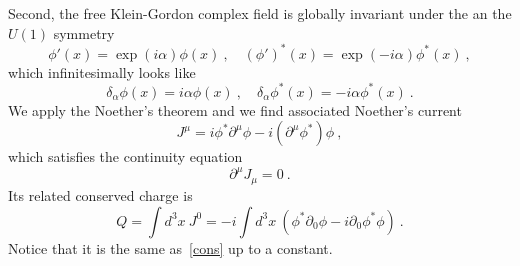     Second, the free Klein-Gordon complex field is globally invariant under the an the $U(1)$ symmetry
    \begin{equation*}
        \phi'(x) = \exp(i \alpha) \phi(x) ~, \quad (\phi')^*(x) = \exp(- i \alpha) \phi^*(x) ~,
    \end{equation*}
    which infinitesimally looks like
    \begin{equation*}
        \delta_\alpha \phi (x) = i \alpha \phi(x) ~, \quad \delta_\alpha \phi^* (x) = - i \alpha \phi^*(x) ~.
    \end{equation*}
    We apply the Noether's theorem and we find associated Noether's current
    \begin{equation*}
        J^\mu = i \phi^* \partial^\mu \phi - i (\partial^\mu \phi^*) \phi ~,
    \end{equation*}
    which satisfies the continuity equation 
    \begin{equation*}
        \partial^\mu J_\mu = 0 ~.
    \end{equation*}
    Its related conserved charge is 
    \begin{equation*}
        Q = \int d^3 x ~ J^0 = - i \int d^3 x ~ (\phi^* \partial_0 \phi - i \partial_0 \phi^* \phi) ~.
    \end{equation*}
    Notice that it is the same as~\eqref{cons} up to a constant.
